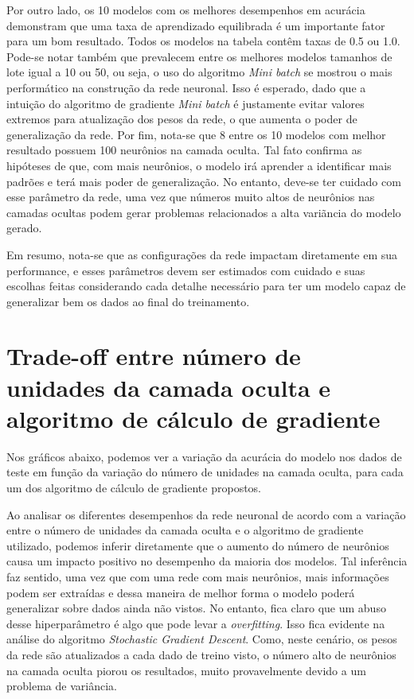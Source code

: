 \documentclass{article}
\begin{document}
Por outro lado, os 10 modelos com os melhores desempenhos em acurácia demonstram que uma taxa de aprendizado equilibrada é um importante fator para um bom resultado. Todos os modelos na tabela contêm taxas de 0.5 ou 1.0. Pode-se notar também que prevalecem entre os melhores modelos tamanhos de lote igual a 10 ou 50, ou seja, o uso do algoritmo \textit{Mini batch} se mostrou o mais performático na construção da rede neuronal. Isso é esperado, dado que a intuição do algoritmo de gradiente \textit{Mini batch} é justamente evitar valores extremos para atualização dos pesos da rede, o que aumenta o poder de generalização da rede.
Por fim, nota-se que 8 entre os 10 modelos com melhor resultado possuem 100 neurônios na camada oculta. Tal fato confirma as hipóteses de que, com mais neurônios, o modelo irá aprender a identificar mais padrões e terá mais poder de generalização. No entanto, deve-se ter cuidado com esse parâmetro da rede, uma vez que números muito altos de neurônios nas camadas ocultas podem gerar problemas relacionados a alta variãncia do modelo gerado.

Em resumo, nota-se que as configurações da rede impactam diretamente em sua performance, e esses parâmetros devem ser estimados com cuidado e suas escolhas feitas considerando cada detalhe necessário para ter um modelo capaz de generalizar bem os dados ao final do treinamento.

\section{Trade-off entre número de unidades da camada oculta e algoritmo de cálculo de gradiente}

Nos gráficos abaixo, podemos ver a variação da acurácia do modelo nos dados de teste em função da variação do número de unidades na camada oculta, para cada um dos algoritmo de cálculo de gradiente propostos.

Ao analisar os diferentes desempenhos da rede neuronal de acordo com a variação entre o número de unidades da camada oculta e o algoritmo de gradiente utilizado, podemos inferir diretamente que o aumento do número de neurônios
causa um impacto positivo no desempenho da maioria dos modelos. Tal inferência faz sentido, uma vez que com uma rede com mais neurônios, mais informações podem ser extraídas e dessa maneira de melhor forma o modelo poderá generalizar sobre
dados ainda não vistos. No entanto, fica claro que um abuso desse hiperparâmetro é algo que pode levar a \textit{overfitting}. Isso fica evidente na análise do algoritmo \textit{Stochastic Gradient Descent}. Como, neste cenário, os pesos da rede são atualizados a cada dado de treino visto, o número alto de neurônios na camada oculta piorou os resultados, muito provavelmente devido
a um problema de variância.
\end{document}
